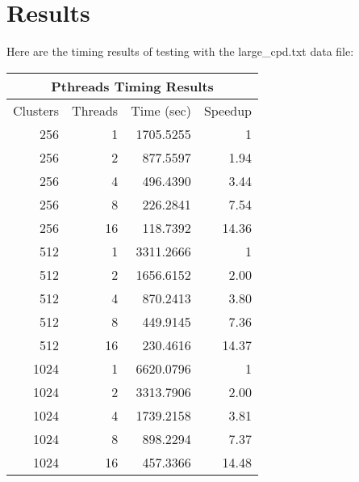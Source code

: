 \documentclass[a4paper]{article}
\begin{document}
\pagebreak

\section{Results}

Here are the timing results of testing with the large\_cpd.txt data file:

\begin{center}
  \begin{tabular}{| r r r r |}
    \hline
    \multicolumn{4}{|c|}{Pthreads Timing Results} \\
    \hline
    Clusters & Threads & Time (sec) & Speedup \\
    \hline
    256 & 1 & 1705.5255 & 1 \\
    256 & 2 & 877.5597 & 1.94 \\
    256 & 4 & 496.4390 & 3.44 \\
    256 & 8 & 226.2841 & 7.54 \\
    256 & 16 & 118.7392 & 14.36 \\
    \hline
    512 & 1 & 3311.2666 & 1 \\
    512 & 2 & 1656.6152 & 2.00 \\
    512 & 4 & 870.2413 & 3.80 \\
    512 & 8 & 449.9145 & 7.36 \\
    512 & 16 & 230.4616 & 14.37 \\
    \hline
    1024 & 1 & 6620.0796 & 1 \\
    1024 & 2 & 3313.7906 & 2.00 \\
    1024 & 4 & 1739.2158 & 3.81 \\
    1024 & 8 & 898.2294 & 7.37 \\
    1024 & 16 & 457.3366 & 14.48 \\
    \hline
  \end{tabular}
\end{center}
\end{document}
